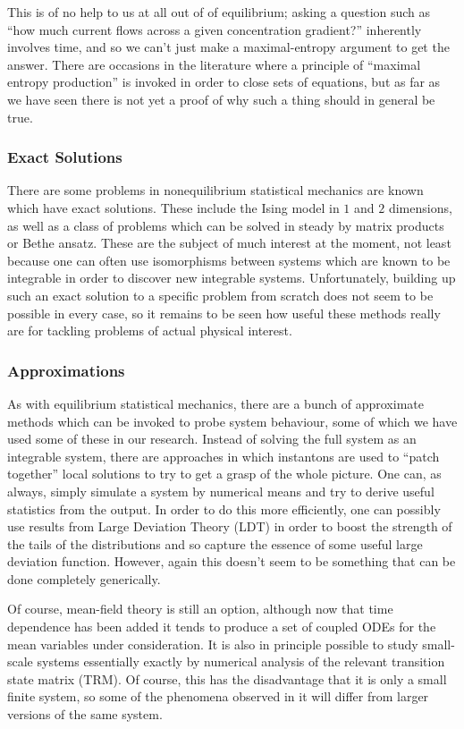 This is of no help to us at all out of of equilibrium; asking a question such as
``how much current flows across a given concentration gradient?'' inherently involves time, and so
we can't just make a maximal-entropy argument to get the answer. There are occasions in the 
literature where a principle of ``maximal entropy production'' is invoked in order to close sets of
equations, but as far as we have seen there is not yet a proof of why such a thing should in
general be true.


\subsubsection{Exact Solutions}
There are some problems in nonequilibrium statistical mechanics are known which have exact solutions. 
These include the Ising model in $1$ and $2$ dimensions, as well as a class of problems which can be
solved in steady by matrix products or Bethe ansatz. These are the subject of much interest at the
moment, not least because one can often use isomorphisms between systems which are known to
be integrable in order to discover new integrable systems. Unfortunately, building up such an exact solution to a specific problem from scratch does not seem to be possible in every case,
so it remains to be seen how useful these methods really are for tackling problems of actual
physical interest.


\subsubsection{Approximations}
As with equilibrium statistical mechanics, there are a bunch of approximate methods which can
be invoked to probe system behaviour, some of which we have used some of these in our research.
Instead of solving the full system as an integrable system, there are approaches in which instantons
are used to ``patch together'' local solutions to try to get a grasp of the whole picture. One can,
as always, simply simulate a system by numerical means and try to derive useful statistics from the
output. In order to do this more efficiently, one can possibly use results from Large Deviation
Theory (LDT) in order to boost the strength of the tails of the distributions and so capture the essence
of some useful large deviation function. However, again this doesn't seem to be something that can
be done completely generically.

Of course, mean-field theory is still an option, although now that time dependence has been added
it tends to produce a set of coupled ODEs for the mean variables under consideration. It is also in
principle possible to study small-scale systems essentially exactly by numerical analysis of the
relevant transition state matrix (TRM). Of course, this has the disadvantage that it is only a
small finite system, so some of the phenomena observed in it will differ from larger versions of the
same system.


